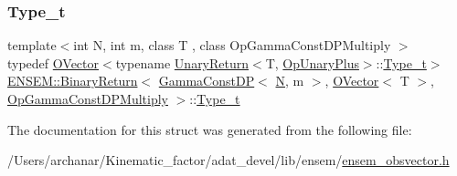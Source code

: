 \subsubsection{\texorpdfstring{Type\_t}{Type\_t}\hspace{0.1cm}{\footnotesize\ttfamily [2/2]}}
{\footnotesize\ttfamily template$<$int N, int m, class T , class Op\+Gamma\+Const\+D\+P\+Multiply $>$ \\
typedef \mbox{\hyperlink{classENSEM_1_1OVector}{O\+Vector}}$<$typename \mbox{\hyperlink{structENSEM_1_1UnaryReturn}{Unary\+Return}}$<$T, \mbox{\hyperlink{structENSEM_1_1OpUnaryPlus}{Op\+Unary\+Plus}}$>$\+::\mbox{\hyperlink{structENSEM_1_1BinaryReturn_3_01GammaConstDP_3_01N_00_01m_01_4_00_01OVector_3_01T_01_4_00_01OpGammaConstDPMultiply_01_4_ad285fa26f308ce9f8939c009aab1bd0e}{Type\+\_\+t}}$>$ \mbox{\hyperlink{structENSEM_1_1BinaryReturn}{E\+N\+S\+E\+M\+::\+Binary\+Return}}$<$ \mbox{\hyperlink{classENSEM_1_1GammaConstDP}{Gamma\+Const\+DP}}$<$ \mbox{\hyperlink{operator__name__util_8cc_a7722c8ecbb62d99aee7ce68b1752f337}{N}}, m $>$, \mbox{\hyperlink{classENSEM_1_1OVector}{O\+Vector}}$<$ T $>$, \mbox{\hyperlink{structENSEM_1_1OpGammaConstDPMultiply}{Op\+Gamma\+Const\+D\+P\+Multiply}} $>$\+::\mbox{\hyperlink{structENSEM_1_1BinaryReturn_3_01GammaConstDP_3_01N_00_01m_01_4_00_01OVector_3_01T_01_4_00_01OpGammaConstDPMultiply_01_4_ad285fa26f308ce9f8939c009aab1bd0e}{Type\+\_\+t}}}



The documentation for this struct was generated from the following file\+:\begin{DoxyCompactItemize}
\item 
/\+Users/archanar/\+Kinematic\+\_\+factor/adat\+\_\+devel/lib/ensem/\mbox{\hyperlink{lib_2ensem_2ensem__obsvector_8h}{ensem\+\_\+obsvector.\+h}}\end{DoxyCompactItemize}
